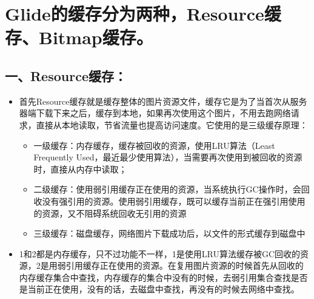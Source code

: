 \documentclass[9pt, b5paper]{article}
\begin{document}
\section{Glide的缓存分为两种，Resource缓存、Bitmap缓存。}
\label{sec-4}
\subsection{一、Resource缓存：}
\label{sec-4-1}
\begin{itemize}
\item 首先Resource缓存就是缓存整体的图片资源文件，缓存它是为了当首次从服务器端下载下来之后，缓存到本地，如果再次使用这个图片，不用去跑网络请求，直接从本地读取，节省流量也提高访问速度。它使用的是三级缓存原理：
\begin{itemize}
\item 一级缓存：内存缓存，缓存被回收的资源，使用LRU算法（Least Frequently Used，最近最少使用算法），当需要再次使用到被回收的资源时，直接从内存中读取；
\item 二级缓存：使用弱引用缓存正在使用的资源，当系统执行GC操作时，会回收没有强引用的资源。使用弱引用缓存，既可以缓存当前正在强引用使用的资源，又不阻碍系统回收无引用的资源
\item 三级缓存：磁盘缓存，网络图片下载成功后，以文件的形式缓存到磁盘中
\end{itemize}
\item 1和2都是内存缓存，只不过功能不一样，1是使用LRU算法缓存被GC回收的资源，2是用弱引用缓存正在使用的资源。在复用图片资源的时候首先从回收的内存缓存集合中查找，内存缓存的集合中没有的时候，去弱引用集合查找是否是当前正在使用，没有的话，去磁盘中查找，再没有的时候去网络中查找。
\end{itemize}
\end{document}
